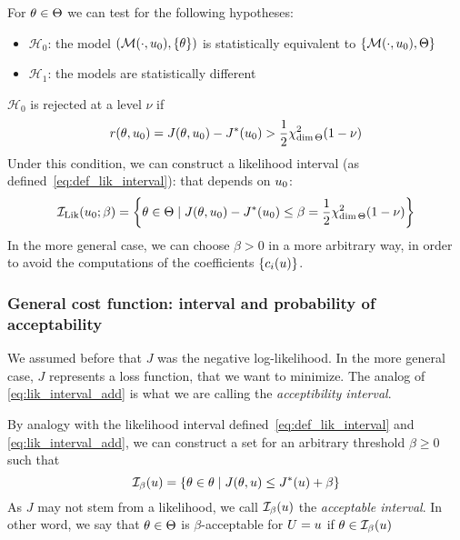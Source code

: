 \documentclass[../../Main_ManuscritThese.tex]{subfiles}
\begin{document}
 For $\theta\in \Theta$ we can test for the following hypotheses:
 \begin{itemize}
 \item $\mathcal{H}_0$: the model $\left(\mathcal{M}(\cdot, u_0), \{\theta\}\right)$ is statistically equivalent to $\left\{\mathcal{M}(\cdot, u_0), \Theta\right\}$
 \item $\mathcal{H}_1$: the models are statistically different
 \end{itemize}
 $\mathcal{H}_0$ is rejected at a level $\nu$ if
  \begin{align}
  r(\theta, u_0)=J(\theta, u_0) - J^*(u_0) > \frac{1}{2}\chi^2_{\dim \Theta}(1-\nu)
  \end{align}
  Under this condition, we can construct a likelihood interval (as defined~\cref{eq:def_lik_interval}): that depends on $u_0$:
  \begin{equation}
    \label{eq:lik_interval_add}
    \mathcal{I}_{\mathrm{Lik}}(u_0; \beta) = \left\{\theta\in \Theta \mid  J(\theta, u_0) - J^*(u_0) \leq \beta=\frac{1}{2}\chi^2_{\dim \Theta}(1-\nu)\right\}
  \end{equation}
   In the more general case, we can choose $\beta>0$ in a more arbitrary way, in order to avoid the computations of the coefficients $\{c_i(u)\}$.
\subsubsection{General cost function: interval and probability of acceptability}
 We assumed before that $J$ was the negative log-likelihood. In the more general case, $J$ represents a loss function, that we want to minimize. The analog of \cref{eq:lik_interval_add} is what we are calling the \emph{acceptibility interval}.
  \begin{definition}
  By analogy with the likelihood interval defined~\cref{eq:def_lik_interval} and \cref{eq:lik_interval_add}, we can construct a set for an arbitrary threshold $\beta \geq 0$ such that
  \begin{equation}
    \mathcal{I}_{\beta}(u) = \left\{\theta \in \theta \mid J(\theta,u) \leq J^*(u) + \beta \right\}
  \end{equation}
As $J$ may not stem from a likelihood, we call $\mathcal{I}_{\beta}(u)$ the \emph{acceptable interval}. In other word, we say that $\theta\in \Theta$ is $\beta$-acceptable for $U=u$ if $\theta \in \mathcal{I}_{\beta}(u)$
\end{definition}
\end{document}
